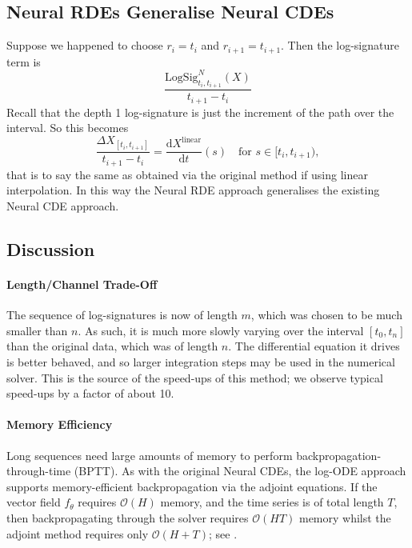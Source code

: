 \documentclass{article}
\newcommand{\logsig}{\mathrm{LogSig}}
\newcommand{\dby}{\mathrm{d}}
\begin{document}
\subsection{Neural RDEs Generalise Neural CDEs}\label{section:generalise}
Suppose we happened to choose $r_i = t_i$ and $r_{i + 1} = t_{i + 1}$. Then the log-signature term is 
\begin{equation*}
    \frac{\logsig_{t_i, t_{i+1}}^N(X)}{t_{i+1} - t_i}
\end{equation*}
Recall that the depth 1 log-signature is just the increment of the path over the interval. So this becomes
\begin{equation*}
    \frac{\Delta X_{[t_i, t_{i+1}]}}{t_{i+1} - t_i} = \frac{\dby X^{\mathrm{linear}}}{\dby t}(s) \quad \text{for } s \in [t_i, t_{i + 1}),
\end{equation*}
that is to say the same as obtained via the original method if using linear interpolation. In this way the Neural RDE approach generalises the existing Neural CDE approach.
    
\subsection{Discussion}\label{subsec:tradeoff}

\paragraph{Length/Channel Trade-Off} 
The sequence of log-signatures is now of length $m$, which was chosen to be much smaller than $n$. As such, it is much more slowly varying over the interval $[t_0, t_n]$ than the original data, which was of length $n$. The differential equation it drives is better behaved, and so larger integration steps may be used in the numerical solver. This is the source of the speed-ups of this method; we observe typical speed-ups by a factor of about 10.



\paragraph{Memory Efficiency} Long sequences need large amounts of memory to perform backpropagation-through-time (BPTT). As with the original Neural CDEs, the log-ODE approach supports memory-efficient backpropagation via the adjoint equations. If the vector field $f_\theta$ requires $\mathcal{O}(H)$ memory, and the time series is of total length $T$, then backpropagating through the solver requires $\mathcal{O}(HT)$ memory whilst the adjoint method requires only $\mathcal{O}(H + T)$; see \citet{kidger2020neural}.
\end{document}
